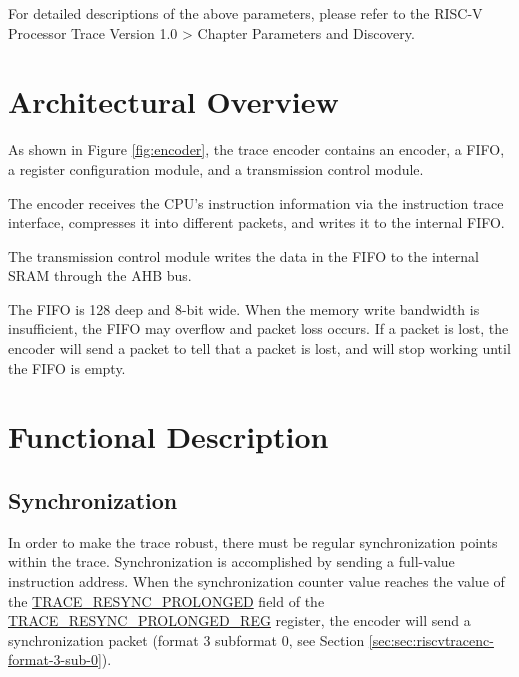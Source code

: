 \documentclass[main\_\_EN.tex]{subfiles}
\begin{document}
For detailed descriptions of the above parameters, please refer to the RISC-V Processor Trace Version 1.0 > Chapter Parameters and Discovery.



\section{Architectural Overview}
\label{sec:riscvtracenc-arch-overview}


As shown in Figure \ref{fig:encoder}, the trace encoder contains an encoder, a FIFO, a register configuration module, and a transmission control module.

The encoder receives the CPU's instruction information via the instruction trace interface, compresses it into different packets, and writes it to the internal FIFO.

The transmission control module writes the data in the FIFO to the internal SRAM through the AHB bus.

The FIFO is 128 deep and 8-bit wide. When the memory write bandwidth is insufficient, the FIFO may overflow and packet loss occurs. If a packet is lost, the encoder will send a packet to tell that a packet is lost, and will stop working until the FIFO is empty.



\section{Functional Description}
\label{sec:riscvtracenc-func-desc}

\subsection{Synchronization}

In order to make the trace robust, there must be regular synchronization points within the trace. Synchronization is accomplished by sending a full-value instruction address. When the synchronization counter value reaches the value of the \hyperref[fielddesc:TRACERESYNCPROLONGED]{TRACE\_RESYNC\_PROLONGED} field of the \hyperref[regdesc:TRACERESYNCPROLONGEDREG]{TRACE\_RESYNC\_PROLONGED\_REG} register, the encoder will send a synchronization packet (format 3 subformat 0, see Section \ref{sec:sec:riscvtracenc-format-3-sub-0}).
\end{document}
